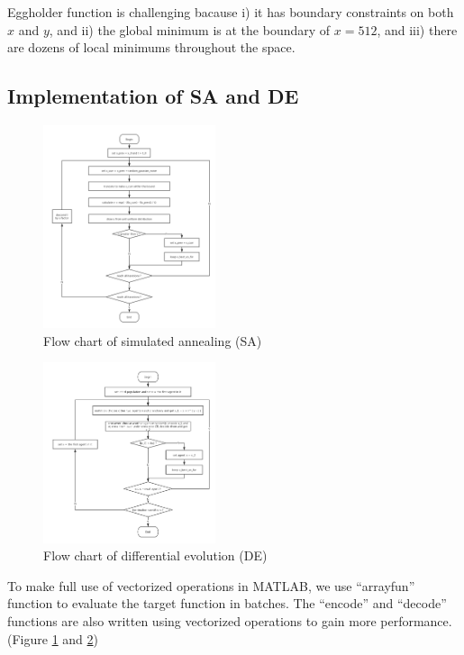 \documentclass{IEEEtran}
\begin{document}
{{        Eggholder function is challenging bacause 
        i) it has boundary constraints on both $x$ and $y$, and 
        ii) the global minimum is at the boundary of $x=512$, and 
        iii) there are dozens of local minimums throughout the space.
        
    }

    \subsection{Implementation of SA and DE}
    {
        \begin{figure}[!htbp]
            \centering
            \includegraphics[width=0.45\textwidth]{figures/SA_algorithm.png}
            \caption{Flow chart of simulated annealing (SA)}
            \label{fig:SA}
        \end{figure}

        \begin{figure}[!htbp]
            \centering
            \includegraphics[width=0.45\textwidth]{figures/DE_algorithm.png}
            \caption{Flow chart of differential evolution (DE)}
            \label{fig:DE}
        \end{figure}

        To make full use of vectorized operations in MATLAB, we use ``arrayfun'' function to evaluate the target function in batches. 
        The ``encode'' and ``decode'' functions are also written using vectorized operations to gain more performance. 
        (Figure \ref{fig:SA} and \ref{fig:DE})
    }

}
\end{document}
